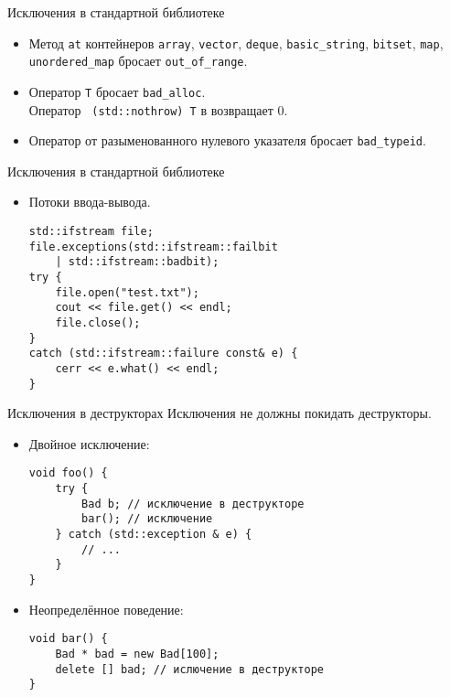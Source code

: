 \documentclass{beamer}
\begin{document}
 

\begin{frame}[fragile]{Исключения в стандартной библиотеке}
\small
\begin{itemize}
    \item Метод \texttt{at} контейнеров {\tt array}, {\tt vector}, {\tt deque}, {\tt basic\_string}, {\tt bitset}, {\tt map}, {\tt unordered\_map} бросает {\tt out\_of\_range}.
    \item Оператор  {\tt T} бросает {\tt bad\_alloc}.\\
    Оператор {\tt {} (std::nothrow) T} в возвращает 0.
    \item Оператор  от разыменованного нулевого указателя бросает {\tt bad\_typeid}.

\end{itemize}
\end{frame}

\begin{frame}[fragile]{Исключения в стандартной библиотеке}
\small
\begin{itemize}
    \item Потоки ввода-вывода. 
    \begin{lstlisting}
std::ifstream file;
file.exceptions(std::ifstream::failbit
    | std::ifstream::badbit);
try {
    file.open("test.txt");
    cout << file.get() << endl;
    file.close();
}
catch (std::ifstream::failure const& e) {
    cerr << e.what() << endl;
}
    \end{lstlisting}
\end{itemize}
\end{frame}


\begin{frame}[fragile]{Исключения в деструкторах}
Исключения не должны покидать деструкторы.
\begin{itemize}
\item Двойное исключение:
\begin{lstlisting}
void foo() {
    try {
        Bad b; // исключение в деструкторе
        bar(); // исключение
    } catch (std::exception & e) {
        // ...
    }
}
\end{lstlisting}
\item Неопределённое поведение:
\begin{lstlisting}
void bar() {
    Bad * bad = new Bad[100];
    delete [] bad; // ислючение в деструкторе
}
\end{lstlisting}
\end{itemize}
\end{frame}
\end{document}
